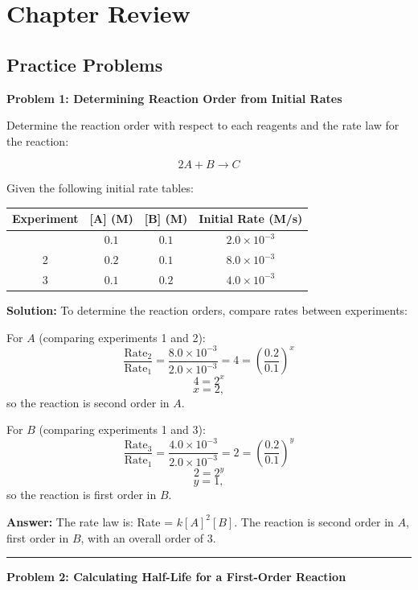 \documentclass[
  9pt,
]{extbook}
\newcounter{none} %
\theoremstyle{definition}
\theoremstyle{definition}
\theoremstyle{definition}
\theoremstyle{definition}
\theoremstyle{remark}
\begin{document}
\section{Chapter Review}\label{rev15}

\subsection{Practice Problems}\label{exer15}

\textbf{Problem 1: Determining Reaction Order from Initial Rates}

Determine the reaction order with respect to each reagents and the rate law for the reaction:

\[2A + B \rightarrow C\]

Given the following initial rate tables:

{\def\LTcaptype{none} %
\begin{longtable}[]{@{}cccc@{}}
\toprule\noalign{}
Experiment & {[}A{]} (M) & {[}B{]} (M) & Initial Rate (M/s) \\
\midrule\noalign{}
\endhead
\bottomrule\noalign{}
\endlastfoot
1 & \(0.1\) & \(0.1\) & \(2.0 \times 10^{-3}\) \\
2 & \(0.2\) & \(0.1\) & \(8.0 \times 10^{-3}\) \\
3 & \(0.1\) & \(0.2\) & \(4.0 \times 10^{-3}\) \\
\end{longtable}
}

\textbf{Solution:} To determine the reaction orders, compare rates between experiments:

For \(A\) (comparing experiments 1 and 2):
\[\frac{\text{Rate}_2}{\text{Rate}_1} = \frac{8.0 \times 10^{-3}}{2.0 \times 10^{-3}} = 4 = \left(\frac{0.2}{0.1}\right)^x\]
\[4 = 2^x\]
\[x = 2,\]
so the reaction is second order in \(A\).

For \(B\) (comparing experiments 1 and 3):
\[\frac{\text{Rate}_3}{\text{Rate}_1} = \frac{4.0 \times 10^{-3}}{2.0 \times 10^{-3}} = 2 = \left(\frac{0.2}{0.1}\right)^y\]
\[2 = 2^y\]
\[y = 1,\]
so the reaction is first order in \(B\).

\textbf{Answer:} The rate law is: Rate = \(k[A]^2[B]\). The reaction is second order in \(A\), first order in \(B\), with an overall order of 3.

\begin{center}\rule{0.5\linewidth}{0.5pt}\end{center}

\textbf{Problem 2: Calculating Half-Life for a First-Order Reaction}
\end{document}
